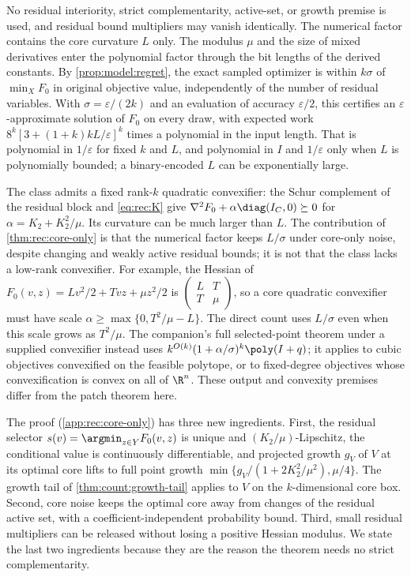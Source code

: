 No residual interiority, strict complementarity, active-set, or growth
premise is used, and residual bound multipliers may vanish identically. The
numerical factor contains the core curvature $L$ only. The modulus $\mu$ and
the size of mixed derivatives enter the polynomial factor through the bit
lengths of the derived constants. By \cref{prop:model:regret}, the exact
sampled optimizer is within $k\sigma$ of $\min_XF_0$ in original objective
value, independently of the number of residual variables. With
$\sigma=\varepsilon/(2k)$ and an evaluation of accuracy $\varepsilon/2$,
this certifies an $\varepsilon$-approximate solution of $F_0$ on every draw,
with expected work $8^k[3+(1+k)kL/\varepsilon]^k$ times a polynomial in the
input length. That is polynomial in $1/\varepsilon$ for fixed $k$ and $L$,
and polynomial in $I$ and $1/\varepsilon$ only when $L$ is polynomially
bounded; a binary-encoded $L$ can be exponentially large.

The class admits a fixed rank-$k$ quadratic convexifier: the Schur complement
of the residual block and \eqref{eq:rec:K} give
$\nabla^2F_0+\alpha\diag(I_C,0)\succeq0$ for $\alpha=K_2+K_2^2/\mu$. Its
curvature can be much larger than $L$. The contribution of
\cref{thm:rec:core-only} is that the numerical factor keeps $L/\sigma$ under
core-only noise, despite changing and weakly active residual bounds; it is
not that the class lacks a low-rank convexifier. For example, the Hessian of
$F_0(v,z)=Lv^2/2+Tvz+\mu z^2/2$ is
$\left(\begin{smallmatrix}L&T\\T&\mu\end{smallmatrix}\right)$, so a core
quadratic convexifier must have scale
$\alpha\ge\max\{0,T^2/\mu-L\}$. The direct count uses $L/\sigma$ even when
this scale grows as $T^2/\mu$. The companion's full selected-point theorem
under a supplied convexifier instead uses
$k^{O(k)}(1+\alpha/\sigma)^k\poly(I+q)$; it applies to cubic objectives
convexified on the feasible polytope, or to fixed-degree objectives whose
convexification is convex on all of $\R^n$. These output and convexity
premises differ from the patch theorem here.

The proof (\cref{app:rec:core-only}) has three new ingredients. First,
the residual selector $s(v)=\argmin_{z\in Y}F_0(v,z)$ is unique and
$(K_2/\mu)$-Lipschitz, the conditional value is continuously differentiable,
and projected growth $g_V$ of $V$ at its optimal core lifts to full point
growth $\min\{g_V/(1+2K_2^2/\mu^2),\mu/4\}$. The growth tail of
\cref{thm:count:growth-tail} applies to $V$ on the $k$-dimensional core box.
Second, core noise keeps the optimal core away from changes of the residual
active set, with a coefficient-independent probability bound. Third, small
residual multipliers can be released without losing a positive Hessian
modulus. We state the last two ingredients because they are the reason the
theorem needs no strict complementarity.

